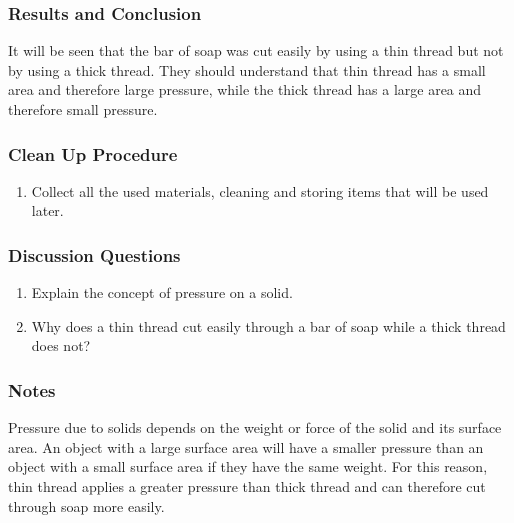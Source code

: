 \subsubsection*{Results and Conclusion}
It will be seen that the bar of soap was cut easily by using a thin thread but not by using a thick thread. They should understand that thin thread has a small area and therefore large pressure, while the thick thread has a large area and therefore small pressure.  

\subsubsection*{Clean Up Procedure}
\begin{enumerate}
\item{Collect all the used materials, cleaning and storing items that will be used later.} 
\end{enumerate}

\subsubsection*{Discussion Questions}
\begin{enumerate}
\item{Explain the concept of pressure on a solid.} 
\item{Why does a thin thread cut easily through a bar of soap while a thick thread does not?}
\end{enumerate}

\subsubsection*{Notes}
Pressure due to solids depends on the weight or force of the solid and its surface area. An object with a large surface area will have a smaller pressure than an object with a small surface area if they have the same weight. For this reason, thin thread applies a greater pressure than thick thread and can therefore cut through soap more easily.
